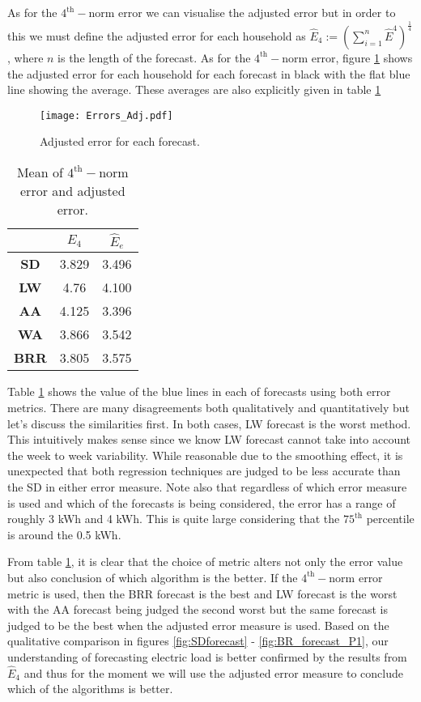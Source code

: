 As for the $4^{\text{th}}-$norm error we can visualise the adjusted error but in order to this we must define the adjusted error for each household as $\hat{E}_4 := \left( \sum_{i=1}^{n} \hat{E}^4\right)^{\frac{1}{4}}$, where $n$ is the length of the forecast. As for the $4^{\text{th}}-$norm error, figure \ref{fig:Adj_err_all} shows the adjusted error for each household for each forecast in black with the flat blue line showing the average. These averages are also explicitly given in table \ref{tab:errs}

\begin{figure}
\centering
\texttt{[image: Errors\_Adj.pdf]}
\caption{\label{fig:Adj_err_all} Adjusted error for each forecast.}
\end{figure}


\begin{table}
\centering
\begin{tabular}{|c|c|c|}
\hline
 & $E_4$ & $\hat{E}_e$ \\
 \hline
\textbf{SD} & 3.829 & 3.496 \\
\textbf{LW} & 4.76 & 4.100 \\ 
\textbf{AA} & 4.125 & 3.396 \\ 
\textbf{WA} & 3.866 & 3.542 \\ 
\textbf{BRR} & 3.805 & 3.575 \\
\hline
\end{tabular}
\caption{Mean of $4^{\text{th}}-$norm error and adjusted error.}
\label{tab:errs}
\end{table}


Table \ref{tab:errs} shows the value of the blue lines in each of forecasts using both error metrics. There are many disagreements both qualitatively and quantitatively but let's discuss the similarities first. In both cases, LW forecast is the worst method. This intuitively makes sense since we know LW forecast cannot take into account the week to week variability. While reasonable due to the smoothing effect, it is unexpected that both regression techniques are judged to be less accurate than the SD in either error measure. Note also that regardless of which error measure is used and which of the forecasts is being considered, the error has a range of roughly 3 kWh and 4 kWh. This is quite large considering that the $75^{\text{th}}$ percentile is around the 0.5 kWh.

From table \ref{tab:errs}, it is clear that the choice of metric alters not only the error value but also conclusion of which algorithm is the better. If the $4^{\text{th}}-$norm error metric is used, then the BRR forecast is the best and LW forecast is the worst with the AA forecast being judged the second worst but the same forecast is judged to be the best when the adjusted error measure is used. Based on the qualitative comparison in figures \ref{fig:SDforecast} - \ref{fig:BR_forecast_P1}, our understanding of forecasting electric load is better confirmed by the results from $\hat{E}_4$ and thus for the moment we will use the adjusted error measure to conclude which of the algorithms is better.






